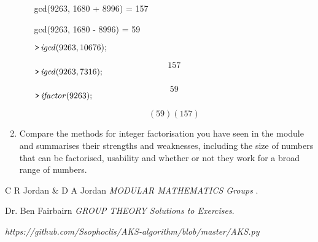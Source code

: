 \documentclass[11pt,a4paper,fleqn]{article}
\begin{document}
\begin{enumerate}[1.]
\begin{enumerate}[a.]
\begin{flushleft}
\begin{mdframed}
                \begin{Maple Normal}
                    gcd(9263, 1680 + 8996) =  157

                    gcd(9263, 1680 - 8996) =  59
                \end{Maple Normal}
                \mapleinput
                {$ \displaystyle \texttt{>\,} \mathit{igcd} (9263,10676); $}

                \begin{dmath}\label{(30)}
                    157
                \end{dmath}
                \mapleinput
                {$ \displaystyle \texttt{>\,} \mathit{igcd} (9263,7316); $}

                \begin{dmath}\label{(31)}
                    59
                \end{dmath}
                \mapleinput
                {$ \displaystyle \texttt{>\,} \mathit{ifactor} (9263); $}

                \begin{dmath}\label{(32)}
                    \left(59\right) \left(157\right)
                \end{dmath}
            \end{mdframed}
            \end{flushleft}
        \end{enumerate}

		\item Compare the methods for integer factorisation you have seen in the module and summarises their strengths and weaknesses, including the size of numbers that can be factorised, usability and whether or not they work for a broad range of numbers.
	\end{enumerate}

	\begin{thebibliography}{unsrt}

		C R Jordan \& D A Jordan \emph{MODULAR MATHEMATICS Groups }.

		Dr. Ben Fairbairn \emph{GROUP THEORY Solutions to Exercises}.

		\emph{https://github.com/Ssophoclis/AKS-algorithm/blob/master/AKS.py}

	\end{thebibliography}
\end{document}
